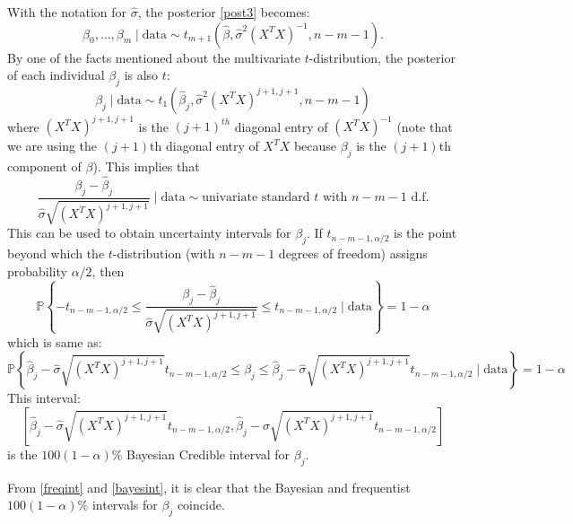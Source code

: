 \documentclass{scrartcl}
\renewcommand{\P}{{\mathbb P}}
\begin{document}
With the notation for $\hat{\sigma}$, the posterior \eqref{post3}
becomes:
\begin{equation}\label{post4}
  \beta_0, \dots, \beta_m \mid \text{data} \sim
  t_{m+1}\left(\hat{\beta},\hat{\sigma}^2 \left(X^T
      X 
  \right)^{-1}, n - m - 1 \right). 
\end{equation}
By one of the facts mentioned about the multivariate $t$-distribution,
the posterior of each individual $\beta_j$ is also $t$:  
  \begin{equation}\label{marg4}
    \beta_j \mid \text{data} \sim t_{1}\left(\hat{\beta}_j,
\hat{\sigma}^2 (X^T X)^{j+1, j+1}, n-m-1 \right) 
  \end{equation}
  where $(X^T X)^{j+1, j+1}$ is the $(j+1)^{th}$ diagonal entry 
  of $(X^T X)^{-1}$ (note that we are using the $(j+1)$th diagonal
  entry of $X^TX$ because $\beta_j$ is the $(j+1)$th component of
  $\beta$). This implies that
  \begin{equation}\label{bayes_t}
    \frac{\beta_j - \hat{\beta}_j}{\hat{\sigma} \sqrt{(X^T X)^{j+1,
          j+1}}} \mid \text{data} \sim \text{univariate standard } t \text{ with }
    n-m-1 \text{ d.f.}
  \end{equation}
  This can be used to obtain uncertainty intervals for $\beta_j$. If
  $t_{n-m-1, \alpha/2}$ is the point beyond which the $t$-distribution
  (with $n-m-1$ degrees of freedom) assigns probability $\alpha/2$,
  then
  \begin{equation*}
    \P \left\{-t_{n-m-1, \alpha/2} \leq     \frac{\beta_j - \hat{\beta}_j}{\hat{\sigma} \sqrt{(X^T X)^{j+1,
          j+1}}} \leq t_{n-m-1, \alpha/2} \mid \text{data} \right\} =
  1 - \alpha
\end{equation*}
which is same as:
\begin{equation*}
  \P \left\{\hat{\beta}_j - \hat{\sigma} \sqrt{(X^T X)^{j+1,
          j+1}} t_{n-m-1, \alpha/2} \leq \beta_j \leq \hat{\beta}_j - \hat{\sigma} \sqrt{(X^T X)^{j+1,
          j+1}} t_{n-m-1, \alpha/2}  \mid \text{data}  \right\} = 1 -
    \alpha 
\end{equation*}
This interval:
\begin{equation}\label{bayesint}
  \left[\hat{\beta}_j - \hat{\sigma} \sqrt{(X^T X)^{j+1,
          j+1}} t_{n-m-1, \alpha/2},  \hat{\beta}_j - \hat{\sigma} \sqrt{(X^T X)^{j+1,
          j+1}} t_{n-m-1, \alpha/2} \right]
  \end{equation}
  is the $100(1-\alpha)\%$ Bayesian Credible interval for
  $\beta_j$.

From \eqref{freqint} and \eqref{bayesint}, it is clear that the
Bayesian and frequentist $100(1
- \alpha)\%$ intervals for $\beta_j$ coincide.
\end{document}
